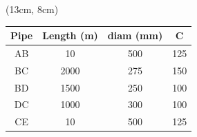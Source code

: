 \documentclass[10pt, oneside]{amsart}
\begin{document}
\begin{textblock*}{.35\textwidth}(13cm, 8cm)
	\centering
	
	\begin{tabular}{cccc}
		\toprule
		Pipe & Length (m) & diam (mm) & C   \\
		\midrule
		AB   & 10         & 500       & 125 \\
		\midrule
		BC   & 2000       & 275       & 150 \\
		\midrule
		BD   & 1500       & 250       & 100 \\
		\midrule
		DC   & 1000       & 300       & 100 \\
		\midrule
		CE   & 10         & 500       & 125 \\
		\bottomrule
	\end{tabular}
\end{textblock*}
~
\vspace{13cm}
\end{document}
